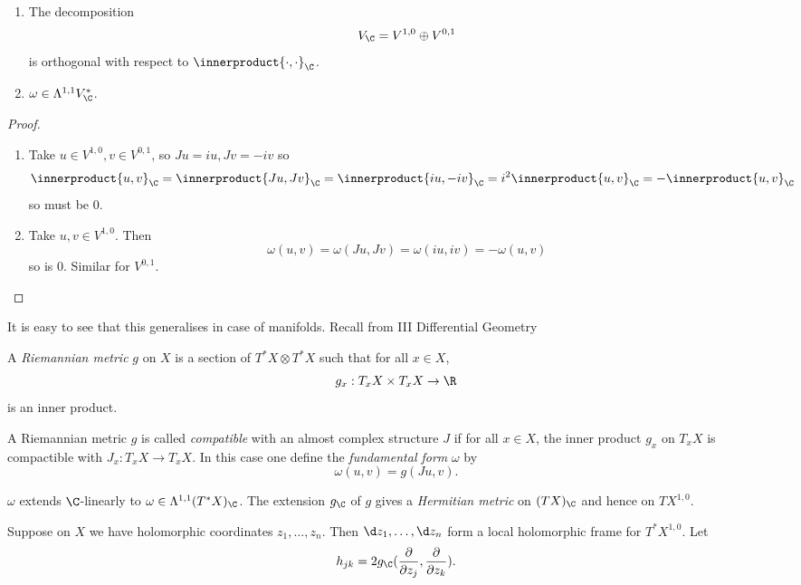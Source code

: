 \documentclass[a4paper]{article}
\newcommand*{\ip}{\innerproduct}
\begin{document}
\begin{lemma}\leavevmode
  \begin{enumerate}
  \item The decomposition
    \[
      V_\C = V^{1, 0} \oplus V^{0, 1}
    \]
    is orthogonal with respect to \(\ip{\cdot, \cdot}_\C\).
  \item \(\omega \in \Lambda^{1, 1} V_\C^*\).
  \end{enumerate}
\end{lemma}

\begin{proof}\leavevmode
  \begin{enumerate}
  \item Take \(u \in V^{1, 0}, v \in V^{0, 1}\), so \(Ju = iu, Jv = -iv\) so
    \[
      \ip{u, v}_\C
      = \ip{Ju, Jv}_\C
      = \ip{iu, -iv}_\C
      = i^2 \ip{u, v}_\C
      = -\ip{u, v}_\C
    \]
    so must be \(0\).
  \item Take \(u, v \in V^{1, 0}\). Then
    \[
      \omega(u, v)
      = \omega(Ju, Jv)
      = \omega(iu, iv)
      = -\omega(u, v)
    \]
    so is \(0\). Similar for \(V^{0, 1}\).
  \end{enumerate}
\end{proof}

It is easy to see that this generalises in case of manifolds. Recall from III Differential Geometry

\begin{definition}
  A \emph{Riemannian metric} \(g\) on \(X\) is a section of \(T^*X \otimes T^*X\) such that for all \(x \in X\),
  \[
    g_x: T_xX \times T_xX \to \R
  \]
  is an inner product.
\end{definition}

\begin{definition}
  A Riemannian metric \(g\) is called \emph{compatible} with an almost complex structure \(J\) if for all \(x \in X\), the inner product \(g_x\) on \(T_xX\) is compactible with \(J_x: T_xX \to T_xX\). In this case one define the \emph{fundamental form} \(\omega\) by
  \[
    \omega(u, v) = g(Ju, v).
  \]
\end{definition}
\(\omega\) extends \(\C\)-linearly to \(\omega \in \Lambda^{1, 1} (T^*X)_\C\). The extension \(g_\C\) of \(g\) gives a \emph{Hermitian metric} on \((TX)_\C\) and hence on \(TX^{1, 0}\).

Suppose on \(X\) we have holomorphic coordinates \(z_1, \dots, z_n\). Then \(\d z_1, \dots, \d z_n\) form a local holomorphic frame for \(T^*X^{1, 0}\). Let
\[
  h_{jk} = 2 g_\C(\frac{\partial  }{\partial z_j}, \frac{\partial  }{\partial z_k}).
\]
\end{document}
